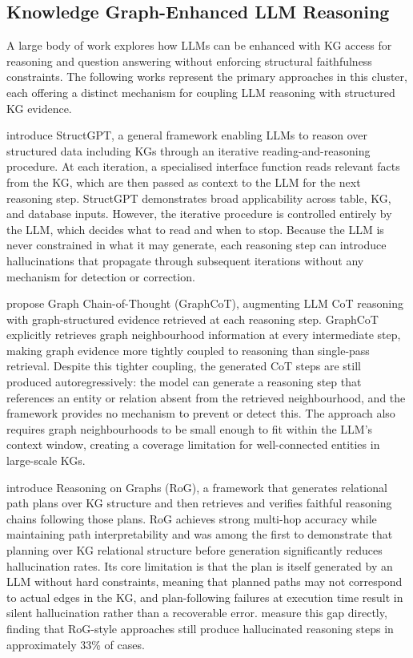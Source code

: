 \subsection{Knowledge Graph-Enhanced LLM Reasoning}

A large body of work explores how LLMs can be enhanced with KG access for reasoning and question answering without enforcing structural faithfulness constraints. The following works represent the primary approaches in this cluster, each offering a distinct mechanism for coupling LLM reasoning with structured KG evidence.

\citet{jiang2023structgpt} introduce StructGPT, a general framework enabling LLMs to reason over structured data including KGs through an iterative reading-and-reasoning procedure. At each iteration, a specialised interface function reads relevant facts from the KG, which are then passed as context to the LLM for the next reasoning step. StructGPT demonstrates broad applicability across table, KG, and database inputs. However, the iterative procedure is controlled entirely by the LLM, which decides what to read and when to stop. Because the LLM is never constrained in what it may generate, each reasoning step can introduce hallucinations that propagate through subsequent iterations without any mechanism for detection or correction.

\citet{jin2024graphcot} propose Graph Chain-of-Thought (GraphCoT), augmenting LLM CoT reasoning with graph-structured evidence retrieved at each reasoning step. GraphCoT explicitly retrieves graph neighbourhood information at every intermediate step, making graph evidence more tightly coupled to reasoning than single-pass retrieval. Despite this tighter coupling, the generated CoT steps are still produced autoregressively: the model can generate a reasoning step that references an entity or relation absent from the retrieved neighbourhood, and the framework provides no mechanism to prevent or detect this. The approach also requires graph neighbourhoods to be small enough to fit within the LLM's context window, creating a coverage limitation for well-connected entities in large-scale KGs.

\citet{luo2024rog} introduce Reasoning on Graphs (RoG), a framework that generates relational path plans over KG structure and then retrieves and verifies faithful reasoning chains following those plans. RoG achieves strong multi-hop accuracy while maintaining path interpretability and was among the first to demonstrate that planning over KG relational structure before generation significantly reduces hallucination rates. Its core limitation is that the plan is itself generated by an LLM without hard constraints, meaning that planned paths may not correspond to actual edges in the KG, and plan-following failures at execution time result in silent hallucination rather than a recoverable error. \citet{luo2024gcr} measure this gap directly, finding that RoG-style approaches still produce hallucinated reasoning steps in approximately 33\% of cases.

